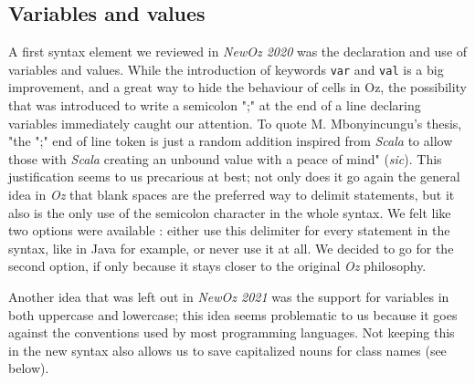 \subsection{Variables and values}
A first syntax element we reviewed in \textit{NewOz 2020} was the declaration and use of variables and values.
While the introduction of keywords \texttt{var} and \texttt{val} is a big improvement, and a great way to hide the behaviour of cells in Oz, the possibility that was introduced to write a semicolon ";" at the end of a line declaring variables immediately caught our attention.
To quote M. Mbonyincungu's thesis, "the ";" end of line token is just a random addition inspired from \textit{Scala} to allow those with \textit{Scala} creating an unbound value with a peace of mind" (\textit{sic}).
This justification seems to us precarious at best;
not only does it go again the general idea in \textit{Oz} that blank spaces are the preferred way to delimit statements, but it also is the only use of the semicolon character in the whole syntax.
We felt like two options were available : either use this delimiter for every statement in the syntax, like in Java for example, or never use it at all.
We decided to go for the second option, if only because it stays closer to the original \textit{Oz} philosophy.\newline

Another idea that was left out in \textit{NewOz 2021} was the support for variables in both uppercase and lowercase;
this idea seems problematic to us because it goes against the conventions used by most programming languages.
Not keeping this in the new syntax also allows us to save capitalized nouns for class names (see below).\newline


